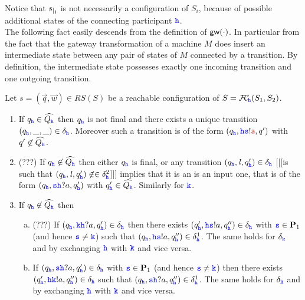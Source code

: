 Notice that $\restrict{s}{i}$ is not necessarily a configuration of $S_i$, because of possible additional states of the connecting participant $\hh$.\\


The following fact easily descends from the definition of $\gateway{\cdot}$.
In particular from the fact that the gateway transformation of a machine $M$ does insert an intermediate state
 between any pair of states of $M$ connected by a transition. By definition, the intermediate state
 possesses exactly one incoming transition and one outgoing transition. 

\begin{fact}
\label{fact:uniquesending}
Let $s= (\vec{q},\vec{w}) \in RS(S)$ be a reachable configuration of
$S =\fusioncomp_{\!\hh}(S_1,S_2)$.
\begin{enumerate}
\item
\label{fact:uniquesending-i}
If ${q_\HH} \in\widehat{Q_\HH}$ then
${q_\HH}$ is not final and
 there exists a unique transition $({q_\HH},\_,\_)\in\delta_\HH$.
  Moreover such a transition is of the form
 $(q_\HH,\HH\tts!\msg[a],q')$ with $q'\not\in\widehat{Q_\HH}$.

\item
\label{fact:uniquesending-ii}
(???) If ${q_\HH}\not\in\widehat{Q_\HH}$ then either $q_\HH$ is final, 
or any transition $({q_\HH},\elle,q'_\hh)\in\delta_\HH$
[[[is such that $({q_\HH},\elle,q'_\hh)\not\in\in\delta^2_\HH$]]] implies that it is an
is an input  one, that 
is of the form $({q_\HH},\tts\HH?a,{q'_\HH})$ with ${q'_\HH}\in\widehat{Q_\HH}$. Similarly for $\KK$.
\item
\label{fact:uniquesending-iii}
If ${q_\HH}\not\in\widehat{Q_\HH}$ then
             \begin{enumerate}[a)]
\item
(???) If $(q_\HH,\KK\HH?a,{q'_\HH})\in\delta_\HH$  then there exists $({q'_\HH},\HH\tts!a,q''_\HH)\in\delta_\HH$ with $\tts \in \roles_1$ (and hence $\tts \neq \KK$) 
such that $(q_\HH,\HH\tts!a,q''_\HH)\in\delta^1_\HH$.
The same holds for $\delta_\KK$ and by exchanging $\HH$ with $\KK$ and vice versa.
\item
If $(q_\HH,\tts\HH?a, {q'_\HH})\in\delta_\HH$ with $\tts \in \roles_1$ (and hence $\tts \neq \KK$)  then there exists   $({q'_\HH},\HH\KK!a,q''_\HH)\in\delta_\HH$  
such that $(q_\HH,\tts\HH?a,q''_\HH)\in\delta^1_\HH$.
The same holds for $\delta_\KK$ and by exchanging $\HH$ with $\KK$ and vice versa.
              \end{enumerate}
\end{enumerate}
\end{fact}

